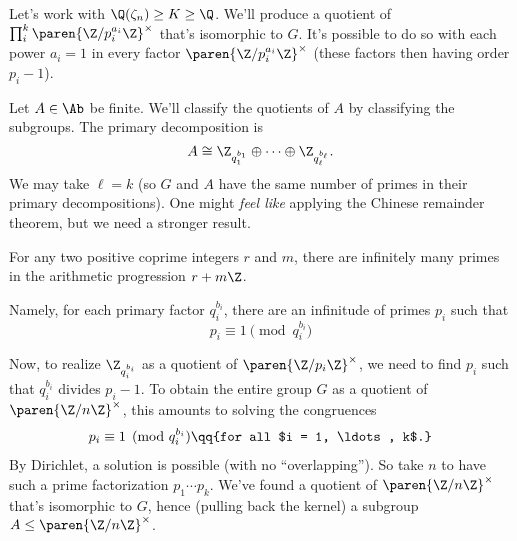 \begin{ex}
    Let's work with $\Q(\zeta_n) \ge K \ge \Q$. 
    We'll produce a quotient of $\prod_i^k \paren{\Z/{p_i^{a_i}}\Z}^\times$ that's isomorphic to $G$. It's possible to do so with each power $a_i = 1$ in every factor $\paren{\Z/{p_i^{a_i}}\Z}^\times$ (these factors then having order $p_i - 1$).

    Let $A \in \Ab$ be finite. We'll classify the quotients of $A$ by classifying the subgroups. The primary decomposition is 
    \begin{equation*}
       A \cong \Z_{q_1^{b_1}} \oplus \cdots \oplus \Z_{q_\ell^{b_\ell}}.
    \end{equation*}
    We may take $\ell = k$ (so $G$ and $A$ have the same number of primes in their primary decompositions).
    One might \emph{feel like} applying the Chinese remainder theorem, but we need a stronger result.

\begin{thm}
    For any two positive coprime integers $r$ and $m$, there are infinitely many primes in the arithmetic progression $r + m\Z$.
\end{thm}

    Namely, for each primary factor ${q_i^{b_i}}$, there are an infinitude of primes $p_i$ such that
    \begin{equation*}
        p_i \equiv 1 \pmod{q_i^{b_i}}
    \end{equation*}

    Now, to realize $\Z_{q_i^{b_i}}$ as a quotient of $\paren{\Z/p_i\Z}^\times$, we need to find $p_i$ such that $q_i^{b_i}$ divides $p_i -1$. To obtain the entire group $G$ as a quotient of $\paren{\Z/n\Z}^\times$, this amounts to solving the congruences 
    \begin{align*}
       p_i \equiv 1 \pmod{q_i^{b_i}} \qq{for all $i = 1, \ldots, k$.}
    \end{align*}
    By Dirichlet, a solution is possible (with no ``overlapping''). So take $n$ to have such a prime factorization $p_1 \cdots p_k$. We've found a quotient of $\paren{\Z/n\Z}^\times$ that's isomorphic to $G$, hence (pulling back the kernel) a subgroup $A \le  \paren{\Z/n\Z}^\times$.
\end{ex}

